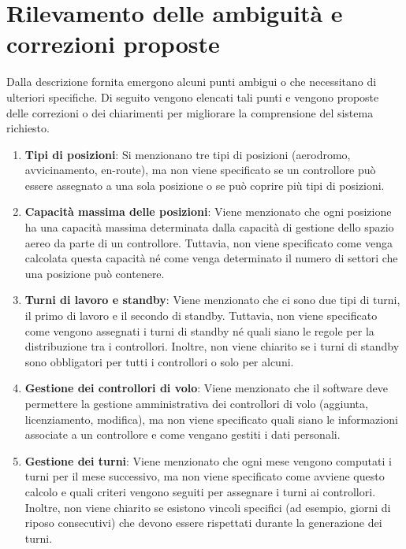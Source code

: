 \section{Rilevamento delle ambiguità e correzioni proposte}

Dalla descrizione fornita emergono alcuni punti ambigui o che necessitano di ulteriori specifiche. Di seguito vengono elencati tali punti e vengono proposte delle correzioni o dei chiarimenti per migliorare la comprensione del sistema richiesto.

\begin{enumerate} 
  \item \textbf{Tipi di posizioni}: Si menzionano tre tipi di posizioni (aerodromo, avvicinamento, en-route), ma non viene specificato se un controllore può essere assegnato a una sola posizione o se può coprire più tipi di posizioni.
  
  \item \textbf{Capacità massima delle posizioni}: Viene menzionato che ogni posizione ha una capacità massima determinata dalla capacità di gestione dello spazio aereo da parte di un controllore. Tuttavia, non viene specificato come venga calcolata questa capacità né come venga determinato il numero di settori che una posizione può contenere.
  
  \item \textbf{Turni di lavoro e standby}: Viene menzionato che ci sono due tipi di turni, il primo di lavoro e il secondo di standby. Tuttavia, non viene specificato come vengono assegnati i turni di standby né quali siano le regole per la distribuzione tra i controllori. Inoltre, non viene chiarito se i turni di standby sono obbligatori per tutti i controllori o solo per alcuni.
    
  \item \textbf{Gestione dei controllori di volo}: Viene menzionato che il software deve permettere la gestione amministrativa dei controllori di volo (aggiunta, licenziamento, modifica), ma non viene specificato quali siano le informazioni associate a un controllore e come vengano gestiti i dati personali.
  
  \item \textbf{Gestione dei turni}: Viene menzionato che ogni mese vengono computati i turni per il mese successivo, ma non viene specificato come avviene questo calcolo e quali criteri vengono seguiti per assegnare i turni ai controllori. Inoltre, non viene chiarito se esistono vincoli specifici (ad esempio, giorni di riposo consecutivi) che devono essere rispettati durante la generazione dei turni.
  

\end{enumerate}
